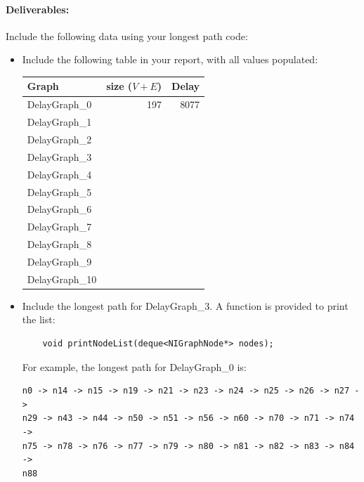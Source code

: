 \paragraph{Deliverables:}
Include the following data using your longest path code:
\begin{itemize}
	\item Include the following table in your report, with all values populated:
	\begin{table}[h!]
	\centering
	\begin{tabular}{|l|r|r|} \hline
	{\bf Graph} & {\bf size ($V+E$)} & Delay \\ \hline
	DelayGraph\_0 & 197 & 8077 \\ \hline
	DelayGraph\_1 &  &  \\ \hline
	DelayGraph\_2 &  &  \\ \hline
	DelayGraph\_3 &  &  \\ \hline
	DelayGraph\_4 &  &  \\ \hline
	DelayGraph\_5 &  &  \\ \hline
	DelayGraph\_6 &  &  \\ \hline
	DelayGraph\_7 &  &  \\ \hline
	DelayGraph\_8 &  &  \\ \hline
	DelayGraph\_9 &  &  \\ \hline
	DelayGraph\_10 &  &  \\ \hline

	\end{tabular}
	\end{table}
	
	\item Include the longest path for DelayGraph\_3.  A function is provided to print the list:
	\begin{lstlisting}
	void printNodeList(deque<NIGraphNode*> nodes);
	\end{lstlisting}
	
	For example, the longest path for DelayGraph\_0 is:
	\begin{lstlisting}
n0 -> n14 -> n15 -> n19 -> n21 -> n23 -> n24 -> n25 -> n26 -> n27 -> 
n29 -> n43 -> n44 -> n50 -> n51 -> n56 -> n60 -> n70 -> n71 -> n74 -> 
n75 -> n78 -> n76 -> n77 -> n79 -> n80 -> n81 -> n82 -> n83 -> n84 -> 
n88

	\end{lstlisting}
\end{itemize}

